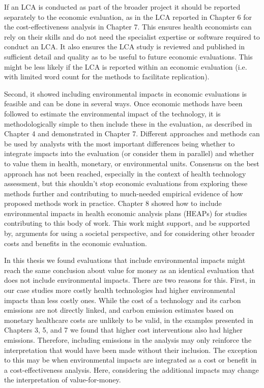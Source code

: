 \begin{refsection}
If an LCA is conducted as part of the broader project it should be reported separately to the economic evaluation, as in the LCA reported in Chapter 6 for the cost-effectiveness analysis in Chapter 7. This ensures health economists can rely on their skills and do not need the specialist expertise or software required to conduct an LCA. It also ensures the LCA study is reviewed and published in sufficient detail and quality as to be useful to future economic evaluations. This might be less likely if the LCA is reported within an economic evaluation (i.e. with limited word count for the methods to facilitate replication).

Second, it showed including environmental impacts in economic evaluations is feasible and can be done in several ways. Once economic methods have been followed to estimate the environmental impact of the technology, it is methodologically simple to then include these in the evaluation, as described in Chapter 4 and demonstrated in Chapter 7. Different approaches and methods can be used by analysts with the most important differences being whether to integrate impacts into the evaluation (or consider them in parallel) and whether to value them in health, monetary, or environmental units. Consensus on the best approach has not been reached, especially in the context of health technology assessment, but this shouldn’t stop economic evaluations from exploring these methods further and contributing to much-needed empirical evidence of how proposed methods work in practice. Chapter 8 showed how to include environmental impacts in health economic analysis plans (HEAPs) for studies contributing to this body of work. This work might support, and be supported by, arguments for using a societal perspective, and for considering other broader costs and benefits in the economic evaluation.

In this thesis we found evaluations that include environmental impacts might reach the same conclusion about value for money as an identical evaluation that does not include environmental impacts. There are two reasons for this. First, in our case studies more costly health technologies had higher environmental impacts than less costly ones. While the cost of a technology and its carbon emissions are not directly linked, and carbon emission estimates based on monetary healthcare costs are unlikely to be valid,\cite{mcalister_how_2024} in the examples presented in Chapters 3, 5, and 7 we found that higher cost interventions also had higher emissions. Therefore, including emissions in the analysis may only reinforce the interpretation that would have been made without their inclusion. The exception to this may be when environmental impacts are integrated as a cost or benefit in a cost-effectiveness analysis. Here, considering the additional impacts may change the interpretation of value-for-money.


\end{refsection}
